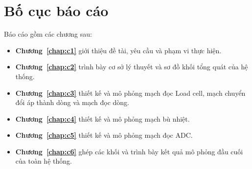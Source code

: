 
\section{Bố cục báo cáo}
\label{sec:c1:bo-cuc}

Báo cáo gồm các chương sau:
\begin{itemize}
    \item \textbf{Chương~\ref{chap:c1}} giới thiệu đề tài, yêu cầu và phạm vi thực hiện.
    \item \textbf{Chương~\ref{chap:c2}} trình bày cơ sở lý thuyết và sơ đồ khối tổng quát của hệ thống.
    \item \textbf{Chương~\ref{chap:c3}} thiết kế và mô phỏng mạch đọc Load cell, mạch chuyển đổi áp thành dòng và mạch đọc dòng.
    \item \textbf{Chương~\ref{chap:c4}} thiết kế và mô phỏng mạch bù nhiệt.
    \item \textbf{Chương~\ref{chap:c5}} thiết kế và mô phỏng mạch đọc ADC.
    \item \textbf{Chương~\ref{chap:c6}} ghép các khối và trình bày kết quả mô phỏng đầu cuối của toàn hệ thống.
\end{itemize}
